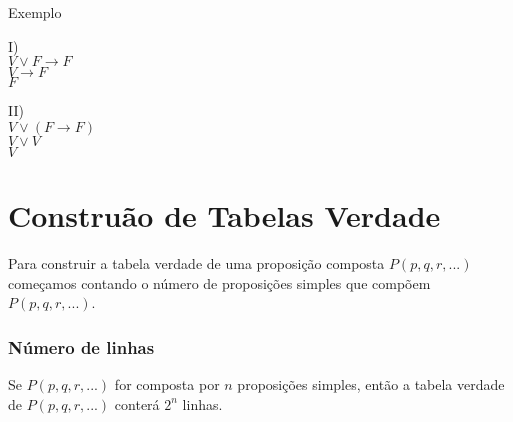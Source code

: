 \begin{center}
Exemplo
\end{center}
\begin{minipage}[l]{0,5\textwidth}
I)\\
$V\vee F\rightarrow F$\\
$V\rightarrow F$\\
$F$\\
\end{minipage}
\begin{minipage}[r]{0,5\textwidth}
II)\\
$V\vee(F\rightarrow F)$\\
$V\vee V$\\
$V$

\end{minipage}

\section{Construão de Tabelas Verdade}

\hspace{0,5cm}Para construir a tabela verdade de uma proposição composta $P(p,q,r,...)$ começamos contando o número de proposições simples que comp{\~o}em $P(p,q,r,...)$.

\subsubsection{Número de linhas}
Se $P(p,q,r,...)$ for composta por $n$ proposições simples, então a tabela verdade de $P(p,q,r,...)$ conterá $2^{n}$ linhas.

